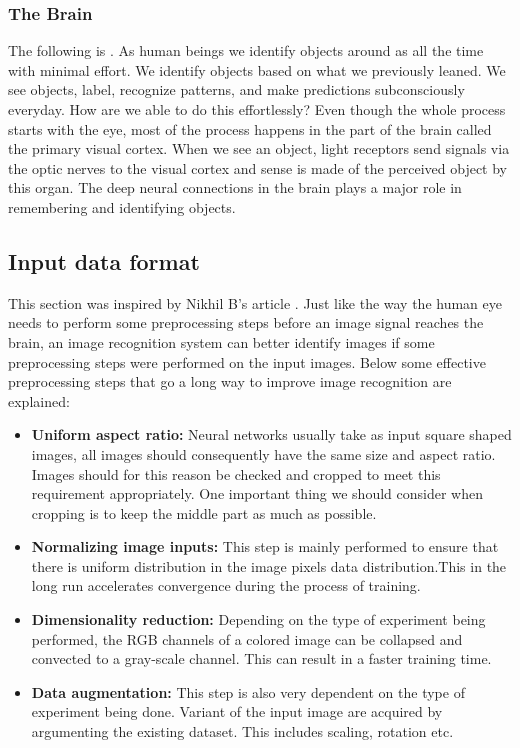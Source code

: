 \documentclass[12pt, a4paper,oneside]{report}
\begin{document}
\subsubsection{The Brain}
The following is . As human beings we identify objects around as all the time with minimal effort. We identify objects based on what we previously leaned. We see objects, label, recognize patterns, and make predictions subconsciously everyday. How are we able to do this effortlessly? Even though the whole process starts with the eye, most of the process happens in the part of the brain called the primary visual cortex. When we see an object, light receptors send signals via the optic nerves to the visual cortex and sense is made of the perceived object by this organ. The deep neural connections in the brain plays a major role in remembering and identifying objects.

\subsection{Input data format}
This section was inspired by Nikhil B's article \cite{input}. Just like the way the human eye needs to perform some preprocessing steps before an image signal reaches the brain, an image recognition system can better identify images if some preprocessing steps were performed on the input images. Below some effective preprocessing steps that go a long way to improve image recognition are explained:

\begin{itemize}
	
	\item \textbf{Uniform aspect ratio:}  Neural networks usually take as input square shaped images, all images should consequently have the same size and aspect ratio. Images should for this reason be checked and cropped to meet this requirement appropriately. One important thing we should consider when cropping is to keep the middle part as much as possible.
	
	\item \textbf{Normalizing image inputs:} This step is mainly performed to ensure that there is uniform distribution in the image pixels data distribution.This in the long run accelerates convergence during the process of training. 

	\item \textbf{Dimensionality reduction:} Depending on the type of experiment being performed, the RGB channels of a colored image can be collapsed and convected to a gray-scale channel. This can result in a faster training time.
	
	\item \textbf{Data augmentation:} This step is also very dependent on the type of experiment being done. Variant of the input image are acquired by argumenting the existing dataset. This includes scaling, rotation etc.
		
\end{itemize} 
\end{document}
